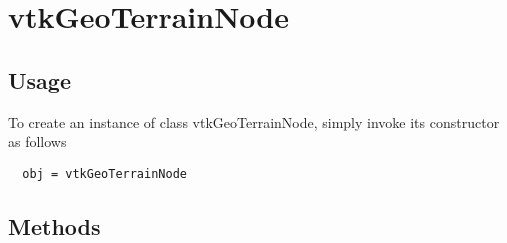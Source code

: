 \section{vtkGeoTerrainNode}

\subsection{Usage}


To create an instance of class vtkGeoTerrainNode, simply
invoke its constructor as follows
\begin{verbatim}
  obj = vtkGeoTerrainNode
\end{verbatim}
\subsection{Methods}

